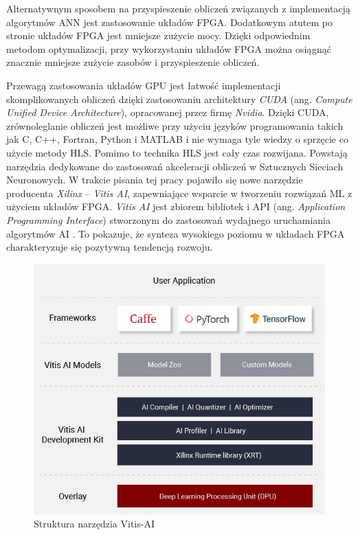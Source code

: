 Alternatywnym sposobem na przyspieszenie obliczeń związanych z implementacją algorytmów ANN jest zastosowanie układów FPGA. Dodatkowym atutem po stronie układów FPGA jest mniejsze zużycie mocy. Dzięki odpowiednim metodom optymalizacji, przy wykorzystaniu układów FPGA można osiągnąć znacznie mniejsze zużycie zasobów i przyspieszenie obliczeń.

Przewagą zastosowania układów GPU jest łatwość implementacji skomplikowanych obliczeń dzięki zastosowaniu architektury \emph
{CUDA} (ang. \emph{Compute Unified Device Architecture}), opracowanej przez firmę \emph{Nvidia}. Dzięki CUDA, zrównoleglanie obliczeń jest możliwe przy użyciu języków programowania takich jak C, C++, Fortran, Python i MATLAB \cite{cuda} i nie wymaga tyle wiedzy o sprzęcie co użycie metody HLS. Pomimo to technika HLS jest cały czas rozwijana. Powstają narzędzia dedykowane do zastosowań akceleracji obliczeń w Sztucznych Sieciach Neuronowych. W trakcie pisania tej pracy pojawiło się nowe narzędzie producenta \emph{Xilinx} -- \emph{Vitis AI}, zapewniające wsparcie w tworzeniu rozwiązań ML z użyciem układów FPGA. \emph{Vitis AI} jest zbiorem bibliotek i API (ang. \emph{Application Programming Interface}) stworzonym do zastosowań wydajnego uruchamiania algorytmów AI \cite{vitis-ai}. To pokazuje, że synteza wysokiego poziomu w układach FPGA charakteryzuje się pozytywną tendencją rozwoju.

\begin{figure}[h]
    \centering
    \includegraphics[width=\textwidth]{img/vitis-AI.jpg}
    \caption{Struktura narzędzia Vitis-AI}
    \label{vitisAI}
  \end{figure}

